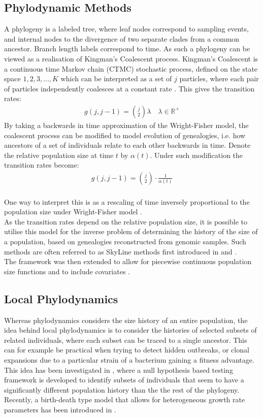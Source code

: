 \documentclass{ieeeaccess}
\newcommand{\R}{\mathbb{R}}
\theoremstyle{definition}
\begin{document}
\subsection{Phylodynamic Methods}
A phylogeny is a labeled tree, where leaf nodes correspond to sampling events, and internal nodes to the divergence of two separate clades from a common ancestor. Branch length labels correspond to time. As such a phylogeny can be viewed as a realisation of Kingman's Coalescent process. 
Kingman's Coalescent is a continuous time Markov chain (CTMC) stochastic process, defined on the state space ${1,2,3, ... ,K}$ which can be interpreted as a set of $j$ particles, where each pair of particles independently coalesces at a constant rate \cite{kingman_coalescent_1982}. This gives the transition rates:
\begin{gather}
g(j, j-1) = \binom{j}{2}\lambda\quad\lambda\in\R^+
\end{gather}
By taking a backwards in time approximation of the Wright-Fisher model, the coalescent process can be modified to model evolution of genealogies, i.e. how ancestors of a set of individuals relate to each other backwards in time. Denote the relative population size at time $t$ by $\alpha(t)$. Under such modification the transition rates become:
\begin{gather}
g(j, j-1) = \binom{j}{2}\cdot\frac{1}{\alpha(t)}
\end{gather}
\cite{griffiths_sampling_1994}\\
One way to interpret this is as a rescaling of time inversely proportional to the population size under Wright-Fisher model \cite{hein_gene_2004}.\\
As the transition rates depend on the relative population size, it is possible to utilise this model for the inverse problem of determining the history of the size of a population, based on genealogies reconstructed from genomic samples.
Such methods are often referred to as SkyLine methods first introduced in \cite{pybus_integrated_2000} and \cite{drummond_estimating_2002}.\\
The framework was then extended to allow for piecewise continuous population size functions \cite{gill_improving_2013} and to include covariates \cite{gill_understanding_2016}.
\subsection{Local Phylodynamics}
Whereas phylodynamics considers the size history of an entire population, the idea behind local phylodynamics is to consider the histories of selected subsets of related individuals, where each subset can be traced to a single ancestor. This can for example be practical when trying to detect hidden outbreaks, or clonal expansions due to a particular strain of a bacterium gaining a fitness advantage. This idea has been investigated in \cite{volz_identification_nodate}, where a null hypothesis based testing framework is developed to identify subsets of individuals that seem to have a significantly different population history than the the rest of the phylogeny. Recently, a birth-death type model that allows for heterogeneous growth rate parameters has been introduced in \cite{barido-sottani_multitype_2020}.
\end{document}
